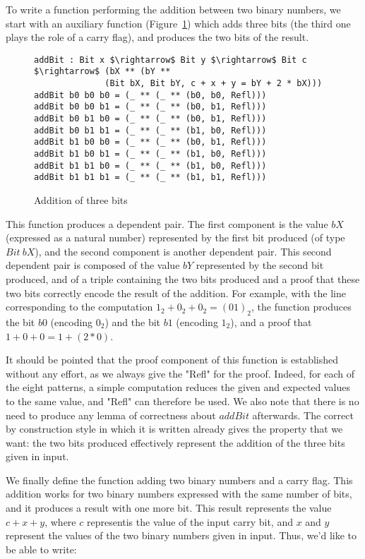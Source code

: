 To write a function performing the addition between two binary numbers,
we start with an auxiliary function (Figure~\ref{addbit}) which adds three bits
(the third one plays the role of a carry flag), and produces the two bits of
the result.

\begin{figure}[H]
\figrule
\begin{center}
\begin{lstlisting}
addBit : Bit x $\rightarrow$ Bit y $\rightarrow$ Bit c $\rightarrow$ (bX ** (bY ** 
              (Bit bX, Bit bY, c + x + y = bY + 2 * bX)))
addBit b0 b0 b0 = (_ ** (_ ** (b0, b0, Refl)))
addBit b0 b0 b1 = (_ ** (_ ** (b0, b1, Refl)))
addBit b0 b1 b0 = (_ ** (_ ** (b0, b1, Refl)))
addBit b0 b1 b1 = (_ ** (_ ** (b1, b0, Refl)))
addBit b1 b0 b0 = (_ ** (_ ** (b0, b1, Refl)))
addBit b1 b0 b1 = (_ ** (_ ** (b1, b0, Refl)))
addBit b1 b1 b0 = (_ ** (_ ** (b1, b0, Refl)))
addBit b1 b1 b1 = (_ ** (_ ** (b1, b1, Refl)))
\end{lstlisting}
\end{center}
\caption{Addition of three bits}
\label{addbit}
\figrule
\end{figure}

This function produces a dependent pair. The first component is the value $bX$
(expressed as a natural number) represented by the first bit produced (of type
$Bit\ bX$), and the second component is another dependent pair. This
second dependent pair is composed of the value $bY$ represented by the second
bit produced, and of a triple containing the two bits produced and a
proof that these two bits correctly encode the result of the addition.
For example, with the line corresponding to the computation
$1_2 + 0_2 + 0_2 = (01)_2$, the function produces the bit $b0$ (encoding $0_2$)
and the bit $b1$ (encoding $1_2$), and a proof that $1 + 0 + 0 = 1 + (2*0)$.

It should be pointed that the proof component of this function is established without any effort, as we always give the "Refl" for the proof. Indeed, for each of the eight patterns, a simple computation reduces the given and expected values to the same value, and "Refl" can therefore be used. We also note that
there is no need to produce any lemma of correctness about $addBit$ afterwards.
The correct by construction style in which it is written already gives the
property that we want: the two bits produced effectively represent the
addition of the three bits given in input.

We finally define the function adding two binary numbers and a carry flag.
This addition works for two binary numbers
expressed with the same number of bits, and it produces a result with one more
bit. This result represents the value $c + x + y$, where $c$ 
representis the value of the input carry bit, and $x$ and $y$ represent
the values of the two binary numbers given in input. Thus, we'd like to
be able to write:

